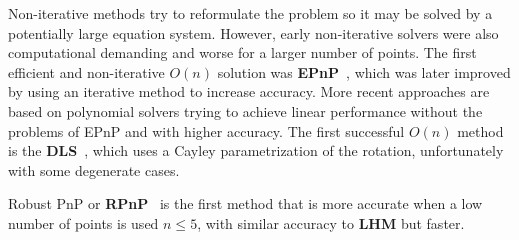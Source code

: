 \documentclass[letterpaper, 10 pt, conference]{ieeeconf}  %
\begin{document}
	Non-iterative methods try to reformulate the problem so it may be solved by a potentially large equation system. However, early non-iterative solvers were also computational demanding and worse for a larger number of points. 	%
	The first efficient and non-iterative $O(n)$ solution was \textbf{EPnP}~\cite{Lepetit2008}, which was later improved by using an iterative method to increase accuracy.
	More recent approaches are based on polynomial solvers trying to achieve linear performance without the problems of EPnP and with higher accuracy. The first successful $O(n)$ method is the \textbf{DLS}~\cite{Hesch2011}, which uses a Cayley parametrization of the rotation, unfortunately with some degenerate cases. %
	
	Robust PnP or \textbf{RPnP}~\cite{Li2012} is the first method that is more accurate when a low number of points is used $n \leq 5$, with similar accuracy to \textbf{LHM} but faster.%
	
\end{document}
